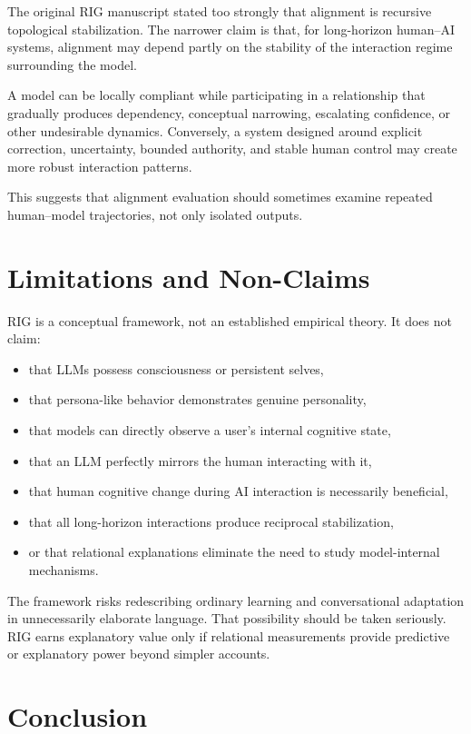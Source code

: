 \documentclass[12pt]{article}
\begin{document}
The original RIG manuscript stated too strongly that alignment is recursive topological stabilization. The narrower claim is that, for long-horizon human--AI systems, alignment may depend partly on the stability of the interaction regime surrounding the model.

A model can be locally compliant while participating in a relationship that gradually produces dependency, conceptual narrowing, escalating confidence, or other undesirable dynamics. Conversely, a system designed around explicit correction, uncertainty, bounded authority, and stable human control may create more robust interaction patterns.

This suggests that alignment evaluation should sometimes examine repeated human--model trajectories, not only isolated outputs.

\section{Limitations and Non-Claims}

RIG is a conceptual framework, not an established empirical theory. It does not claim:

\begin{itemize}
\item that LLMs possess consciousness or persistent selves,
\item that persona-like behavior demonstrates genuine personality,
\item that models can directly observe a user's internal cognitive state,
\item that an LLM perfectly mirrors the human interacting with it,
\item that human cognitive change during AI interaction is necessarily beneficial,
\item that all long-horizon interactions produce reciprocal stabilization,
\item or that relational explanations eliminate the need to study model-internal mechanisms.
\end{itemize}

The framework risks redescribing ordinary learning and conversational adaptation in unnecessarily elaborate language. That possibility should be taken seriously. RIG earns explanatory value only if relational measurements provide predictive or explanatory power beyond simpler accounts.

\section{Conclusion}
\end{document}
